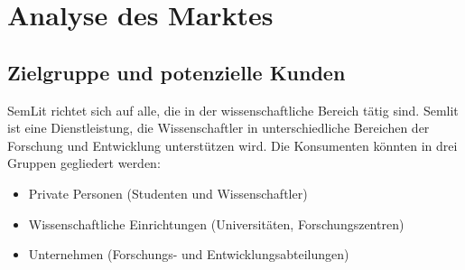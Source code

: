 \section{Analyse des Marktes}


\subsection{Zielgruppe und potenzielle Kunden}
SemLit richtet sich auf alle, die in der wissenschaftliche Bereich tätig sind. Semlit ist eine Dienstleistung, die Wissenschaftler in unterschiedliche Bereichen der Forschung und Entwicklung unterstützen wird. Die Konsumenten könnten in drei Gruppen gegliedert werden:
\begin{itemize}
\item Private Personen (Studenten und Wissenschaftler)

\item Wissenschaftliche Einrichtungen (Universitäten, Forschungszentren)

\item Unternehmen (Forschungs- und Entwicklungsabteilungen)
\end{itemize}


